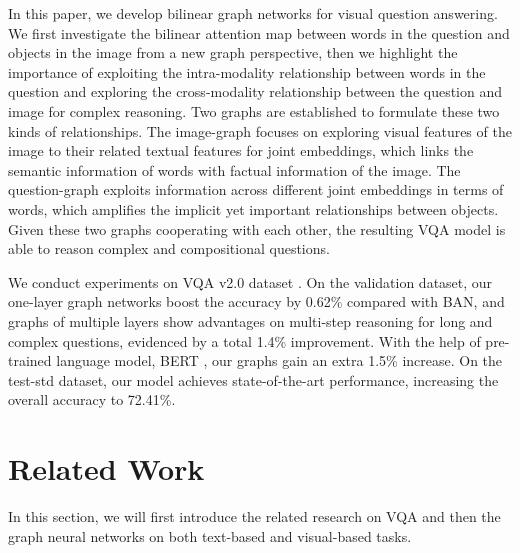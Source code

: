 \documentclass[10pt,twocolumn,letterpaper]{article}
\begin{document}
In this paper, we develop bilinear graph networks for visual question answering. We first investigate the bilinear attention map between words in the question and objects in the image from a new graph perspective, then we highlight the importance of exploiting the intra-modality relationship between words in the question and exploring the cross-modality relationship between the question and image for complex reasoning. Two graphs are established to formulate these two kinds of relationships. The image-graph focuses on exploring visual features of the image to their related textual features for joint embeddings, which links the semantic information of words with factual information of the image. The question-graph exploits information across different joint embeddings in terms of words, which amplifies the implicit yet important relationships between objects. Given these two graphs cooperating with each other, the resulting VQA model is able to reason complex and compositional questions. 

We conduct experiments on VQA v2.0 dataset \cite{goyal2017making}. On the validation dataset, our one-layer graph networks boost the accuracy by 0.62\% compared with BAN, and graphs of multiple layers show advantages on multi-step reasoning for long and complex questions, evidenced by a total 1.4\% improvement. With the help of pre-trained language model, BERT \cite{devlin2018bert}, our graphs gain an extra 1.5\% increase. On the test-std dataset, our model achieves state-of-the-art performance, increasing the overall accuracy to 72.41\%.

\section{Related Work}
In this section, we will first introduce the related research on VQA and then the graph neural networks on both text-based and visual-based tasks.
\end{document}
